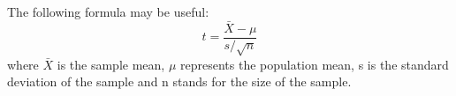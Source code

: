 The following formula may be useful:
$$ t = \frac{\bar{X} - \mu}{s / \sqrt{n}} $$
where $\bar{X}$ is the sample mean, $\mu$ represents the population mean, s is the standard deviation of the sample and n stands for the size of the sample.